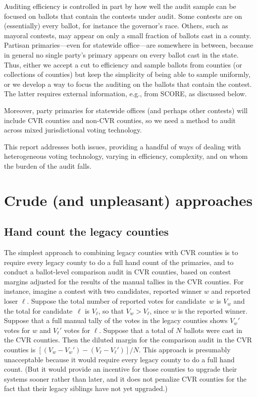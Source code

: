 \documentclass[12pt]{article}
\begin{document}
Auditing efficiency is controlled in part by how well the audit sample can be focused on ballots that
contain the contests under audit.
Some contests are on (essentially) every ballot, for instance the governor's race.
Others, such as mayoral contests, may appear on only a small fraction of ballots cast in
a county.
Partisan primaries---even for statewide office---are somewhere in between,
because in general no single party's primary appears on every ballot cast in the state.
Thus, either we accept a cut to efficiency and sample ballots from counties (or collections of counties)
but keep the simplicity of being able to sample uniformly, or we develop a way to
focus the auditing on the ballots that contain the contest.
The latter requires external information, e.g., from SCORE, as discussed below.

Moreover, party primaries for statewide offices (and perhaps other contests) will
include CVR counties and non-CVR counties, so we need a method to audit
across mixed jurisdictional voting technology.

This report addresses both issues, providing a handful of ways of dealing with heterogeneous
voting technology, varying in efficiency, complexity, and on whom the burden of the audit falls.

\section{Crude (and unpleasant) approaches}

\subsection{Hand count the legacy counties}
The simplest approach to combining legacy counties with CVR counties is to require every
legacy county to do a full hand count of the primaries, and to conduct a 
ballot-level comparison audit in CVR counties, based on contest margins adjusted for
the results of the manual tallies in the CVR counties.
For instance, imagine a contest with two candidates, reported winner $w$ and reported loser $\ell$.
Suppose the total number of reported votes for candidate~$w$ is $V_w$ 
and the total for candidate~$\ell$ is $V_\ell$, so that $V_w > V_\ell$, since 
$w$ is the reported winner.
Suppose that a full manual tally of the votes in the legacy counties shows $V_w'$ votes for $w$ and
$V_\ell'$ votes for $\ell$.
Suppose that a total of $N$ ballots were cast in the CVR counties.
Then the diluted margin for the comparison audit in the CVR counties is 
$[(V_w-V_w')-(V_\ell-V_\ell')]/N$.
This approach is presumably unacceptable because it would require every legacy county to do a full hand
count. 
(But it would provide an incentive for those counties to upgrade their systems
sooner rather than later, and it does not penalize CVR counties for the fact that their
legacy siblings have not yet upgraded.)
\end{document}
